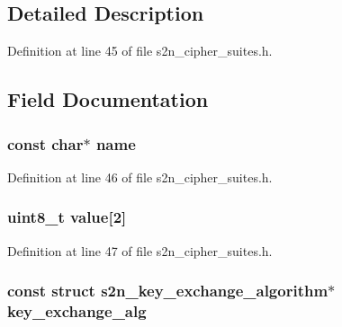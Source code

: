 \subsection{Detailed Description}


Definition at line 45 of file s2n\+\_\+cipher\+\_\+suites.\+h.



\subsection{Field Documentation}
\subsubsection[{\texorpdfstring{name}{name}}]{\setlength{\rightskip}{0pt plus 5cm}const char$\ast$ name}\hypertarget{structs2n__cipher__suite_a8f8f80d37794cde9472343e4487ba3eb}{}\label{structs2n__cipher__suite_a8f8f80d37794cde9472343e4487ba3eb}


Definition at line 46 of file s2n\+\_\+cipher\+\_\+suites.\+h.

\subsubsection[{\texorpdfstring{value}{value}}]{\setlength{\rightskip}{0pt plus 5cm}uint8\+\_\+t value\mbox{[}2\mbox{]}}\hypertarget{structs2n__cipher__suite_a9b3a865c19b6bc5b1d68ff63ed97b6c5}{}\label{structs2n__cipher__suite_a9b3a865c19b6bc5b1d68ff63ed97b6c5}


Definition at line 47 of file s2n\+\_\+cipher\+\_\+suites.\+h.

\subsubsection[{\texorpdfstring{key\+\_\+exchange\+\_\+alg}{key_exchange_alg}}]{\setlength{\rightskip}{0pt plus 5cm}const struct {\bf s2n\+\_\+key\+\_\+exchange\+\_\+algorithm}$\ast$ key\+\_\+exchange\+\_\+alg}\hypertarget{structs2n__cipher__suite_aaf88ce0be23d983d21bbbecfce1c293d}{}\label{structs2n__cipher__suite_aaf88ce0be23d983d21bbbecfce1c293d}


